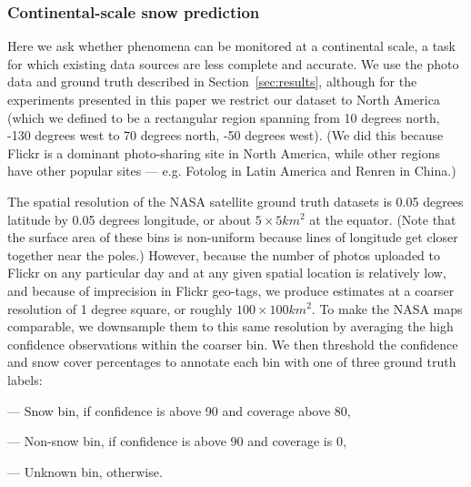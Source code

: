 \documentclass[10pt,journal,compsoc]{IEEEtran}
\begin{document}
\subsubsection{{Continental-scale snow prediction}}

Here we ask whether phenomena can be
monitored at a continental scale, a task for which existing data
sources are less complete and accurate.  We use the photo data and
ground truth described in Section~\ref{sec:results}, although for the
experiments presented in this paper we restrict our dataset to North
America (which we defined to be a rectangular region spanning from 10
degrees north, -130 degrees west to 70 degrees north, -50 degrees
west). (We did this because Flickr is a dominant photo-sharing site in
North America, while other regions have other popular
sites --- e.g. Fotolog in Latin America and Renren in China.)  

The spatial resolution of the NASA satellite ground truth datasets is 0.05 degrees
latitude by 0.05 degrees longitude, or about $5 \times 5 km^2$ at the
equator.  (Note that the surface area of these bins is
non-uniform because lines of longitude get closer together near the
poles.)  However, because the number of photos uploaded to Flickr on
any particular day and at any given spatial location is relatively
low, and because of imprecision in Flickr geo-tags, we produce
estimates at a coarser resolution of 1 degree square, or roughly $100
\times 100 km^2$. To make the NASA maps comparable, we downsample them
to this same resolution by averaging the high confidence observations within the coarser bin.
We then threshold the confidence and snow cover percentages to annotate
each bin with one of three ground truth labels: 
%
\begin{packed_itemize}
\item[---] Snow bin, if confidence is above 90 and coverage above 80,
\item[---] Non-snow bin, if confidence is above 90 and coverage is 0,
\item[---] Unknown bin, otherwise.
\end{packed_itemize}
%
\end{document}
